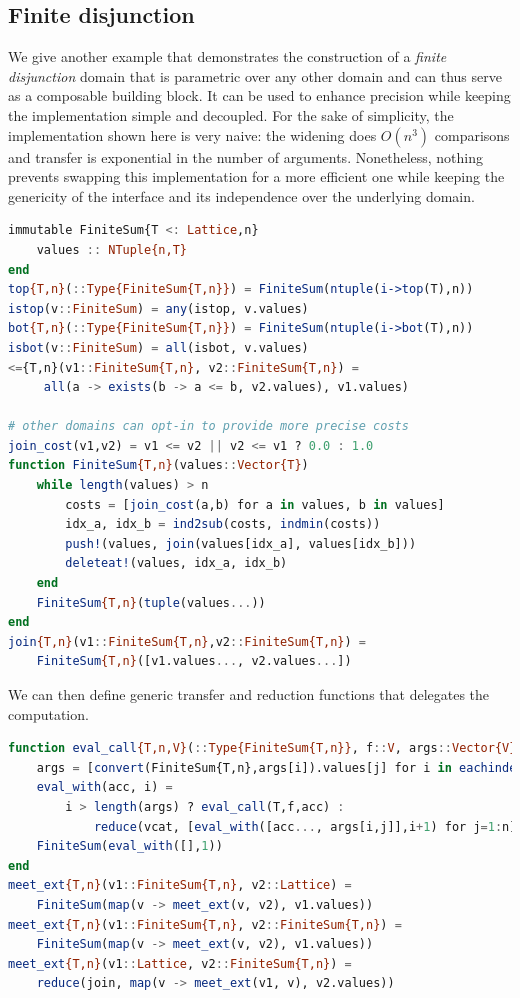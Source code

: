 \documentclass[11pt]{article}
\begin{document}
\subsection*{Finite disjunction}

We give another example that demonstrates the construction of a \emph{finite disjunction} domain that is parametric over any other domain and can thus serve as a composable building block. It can be used to enhance precision while keeping the implementation simple and decoupled. For the sake of simplicity, the implementation shown here is very naive: the widening does $O(n^3)$ comparisons and transfer is exponential in the number of arguments. Nonetheless, nothing prevents swapping this implementation for a more efficient one while keeping the genericity of the interface and its independence over the underlying domain.

\begin{lstlisting}[language=julia]
immutable FiniteSum{T <: Lattice,n}
    values :: NTuple{n,T}
end
top{T,n}(::Type{FiniteSum{T,n}}) = FiniteSum(ntuple(i->top(T),n))
istop(v::FiniteSum) = any(istop, v.values)
bot{T,n}(::Type{FiniteSum{T,n}}) = FiniteSum(ntuple(i->bot(T),n))
isbot(v::FiniteSum) = all(isbot, v.values)
<={T,n}(v1::FiniteSum{T,n}, v2::FiniteSum{T,n}) =
     all(a -> exists(b -> a <= b, v2.values), v1.values)

# other domains can opt-in to provide more precise costs
join_cost(v1,v2) = v1 <= v2 || v2 <= v1 ? 0.0 : 1.0
function FiniteSum{T,n}(values::Vector{T})
    while length(values) > n
        costs = [join_cost(a,b) for a in values, b in values]
        idx_a, idx_b = ind2sub(costs, indmin(costs))
        push!(values, join(values[idx_a], values[idx_b]))
        deleteat!(values, idx_a, idx_b)
    end
    FiniteSum{T,n}(tuple(values...))
end
join{T,n}(v1::FiniteSum{T,n},v2::FiniteSum{T,n}) =
    FiniteSum{T,n}([v1.values..., v2.values...])
\end{lstlisting}

We can then define generic transfer and reduction functions that delegates the computation.

\begin{lstlisting}[language=julia]
function eval_call{T,n,V}(::Type{FiniteSum{T,n}}, f::V, args::Vector{V})
    args = [convert(FiniteSum{T,n},args[i]).values[j] for i in eachindex(args), j=1:n]
    eval_with(acc, i) =
        i > length(args) ? eval_call(T,f,acc) :
            reduce(vcat, [eval_with([acc..., args[i,j]],i+1) for j=1:n])
    FiniteSum(eval_with([],1))
end
meet_ext{T,n}(v1::FiniteSum{T,n}, v2::Lattice) =
    FiniteSum(map(v -> meet_ext(v, v2), v1.values))
meet_ext{T,n}(v1::FiniteSum{T,n}, v2::FiniteSum{T,n}) =
    FiniteSum(map(v -> meet_ext(v, v2), v1.values))
meet_ext{T,n}(v1::Lattice, v2::FiniteSum{T,n}) =
    reduce(join, map(v -> meet_ext(v1, v), v2.values))
\end{lstlisting}
\end{document}

